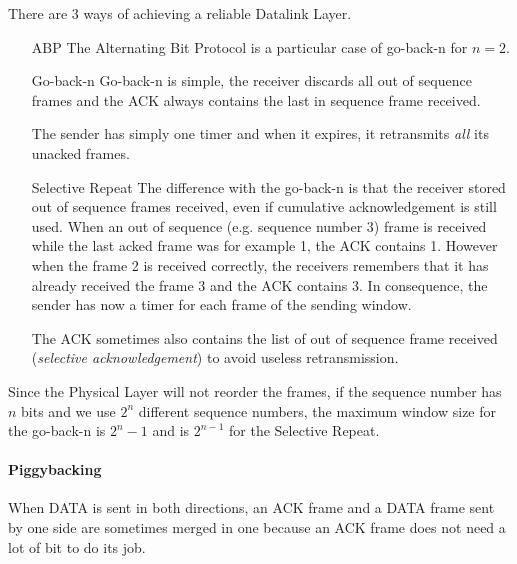 There are 3 ways of achieving a reliable Datalink Layer.
\begin{enumerate}
  \item[ABP]
    The Alternating Bit Protocol is
    a particular case of go-back-n for $n = 2$.
  \item[Go-back-n]
    Go-back-n is simple, the receiver discards all out of sequence frames
    and the ACK always contains the last in sequence frame received.

    The sender has simply one timer and when it expires, it retransmits \emph{all}
    its unacked frames.
  \item[Selective Repeat]
    The difference with the go-back-n is that the receiver stored out of sequence frames received,
    even if cumulative acknowledgement is still used.
    When an out of sequence (e.g. sequence number 3) frame is received while the last acked frame was for example 1,
    the ACK contains 1.
    However when the frame 2 is received correctly, the receivers remembers that it has already received the frame 3
    and the ACK contains 3.
    In consequence, the sender has now a timer for each frame of the sending window.

    The ACK sometimes also contains the list of out of sequence frame received (\emph{selective acknowledgement})
    to avoid useless retransmission.
\end{enumerate}

Since the Physical Layer will not reorder the frames,
if the sequence number has $n$ bits and we use $2^n$ different sequence numbers,
the maximum window size for the go-back-n is $2^n-1$ and is $2^{n-1}$ for the Selective Repeat.

\paragraph{Piggybacking}
When DATA is sent in both directions, an ACK frame and a DATA frame sent by one side are sometimes merged in one
because an ACK frame does not need a lot of bit to do its job.

\biblio


